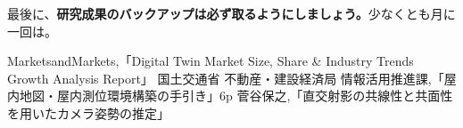 \documentclass[]{jarticle}          %
\begin{document}
最後に、\textbf{研究成果のバックアップは必ず取るようにしましょう。}少なくとも月に一回は。

\begin{thebibliography}{99}
  MarketsandMarkets,「Digital Twin Market Size, Share \& Industry Trends Growth Analysis Report」
  国土交通省 不動産・建設経済局 情報活用推進課,「屋内地図・屋内測位環境構築の手引き」6p
  菅谷保之,「直交射影の共線性と共面性を用いたカメラ姿勢の推定」
\end{thebibliography}
\end{document}
